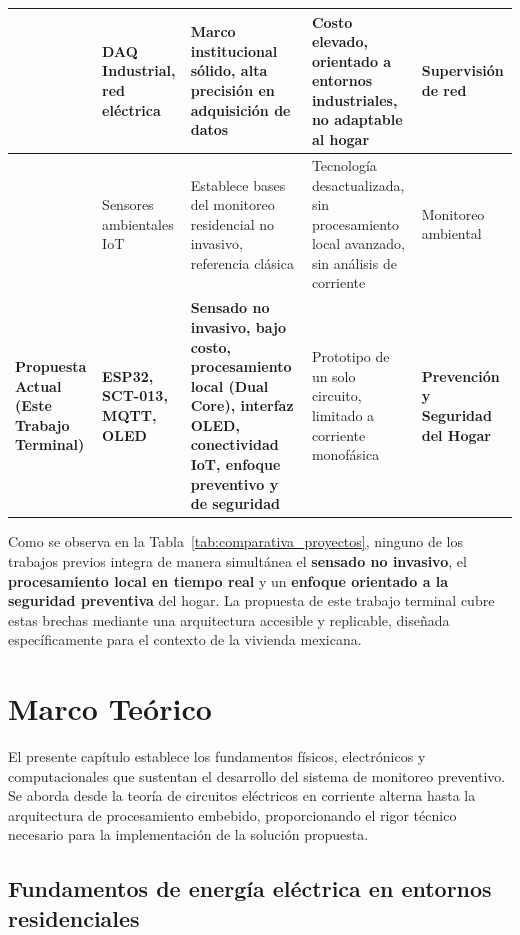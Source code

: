 ﻿\documentclass[12pt,openright,oneside]{report}
\theoremstyle{mytheoremstyle}
\theoremstyle{mytheoremstyle}
\theoremstyle{myproblemstyle}
\begin{document}
\begin{table}[htbp]
{\begin{tabular}{|p{3.5cm}|p{3cm}|p{4cm}|p{4cm}|p{3.5cm}|}
\citeauthor{ipn2023sistema} \citeyear{ipn2023sistema}
& DAQ Industrial, red eléctrica
& Marco institucional sólido, alta precisión en adquisición de datos
& Costo elevado, orientado a entornos industriales, no adaptable al hogar
& Supervisión de red \\ \hline

\citeauthor{kelly2013low} \citeyear{kelly2013low}
& Sensores ambientales IoT
& Establece bases del monitoreo residencial no invasivo, referencia clásica
& Tecnología desactualizada, sin procesamiento local avanzado, sin análisis de corriente
& Monitoreo ambiental \\ \hline

\rowcolor{green!15}
\textbf{Propuesta Actual} \newline \textbf{(Este Trabajo Terminal)}
& \textbf{ESP32, SCT-013, MQTT, OLED}
& \textbf{Sensado no invasivo, bajo costo, procesamiento local (Dual Core), interfaz OLED, conectividad IoT, enfoque preventivo y de seguridad}
& Prototipo de un solo circuito, limitado a corriente monofásica
& \textbf{Prevención y Seguridad del Hogar} \\ \hline

\end{tabular}%
}
\end{table}

Como se observa en la Tabla~\ref{tab:comparativa_proyectos}, ninguno de los trabajos previos integra de manera simultánea el \textbf{sensado no invasivo}, el \textbf{procesamiento local en tiempo real} y un \textbf{enfoque orientado a la seguridad preventiva} del hogar. La propuesta de este trabajo terminal cubre estas brechas mediante una arquitectura accesible y replicable, diseñada específicamente para el contexto de la vivienda mexicana.
\chapter{Marco Teórico}
\label{cap:marco_teorico}

El presente capítulo establece los fundamentos físicos, electrónicos y computacionales que sustentan el desarrollo del sistema de monitoreo preventivo. Se aborda desde la teoría de circuitos eléctricos en corriente alterna hasta la arquitectura de procesamiento embebido, proporcionando el rigor técnico necesario para la implementación de la solución propuesta.

\section{Fundamentos de energía eléctrica en entornos residenciales}
\label{sec:fundamentos_electricos}
\end{document}
